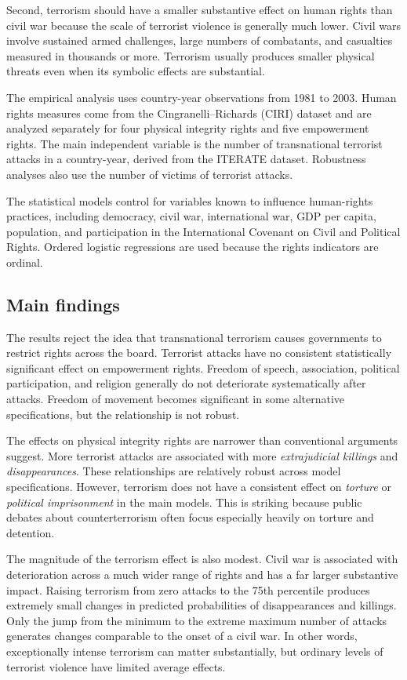 Second, terrorism should have a smaller substantive effect on human rights than civil war because the scale of terrorist violence is generally much lower. Civil wars involve sustained armed challenges, large numbers of combatants, and casualties measured in thousands or more. Terrorism usually produces smaller physical threats even when its symbolic effects are substantial.

The empirical analysis uses country-year observations from 1981 to 2003. Human rights measures come from the Cingranelli--Richards (CIRI) dataset and are analyzed separately for four physical integrity rights and five empowerment rights. The main independent variable is the number of transnational terrorist attacks in a country-year, derived from the ITERATE dataset. Robustness analyses also use the number of victims of terrorist attacks.

The statistical models control for variables known to influence human-rights practices, including democracy, civil war, international war, GDP per capita, population, and participation in the International Covenant on Civil and Political Rights. Ordered logistic regressions are used because the rights indicators are ordinal.

\subsection{Main findings}

The results reject the idea that transnational terrorism causes governments to restrict rights across the board. Terrorist attacks have no consistent statistically significant effect on empowerment rights. Freedom of speech, association, political participation, and religion generally do not deteriorate systematically after attacks. Freedom of movement becomes significant in some alternative specifications, but the relationship is not robust.

The effects on physical integrity rights are narrower than conventional arguments suggest. More terrorist attacks are associated with more \textit{extrajudicial killings} and \textit{disappearances}. These relationships are relatively robust across model specifications. However, terrorism does not have a consistent effect on \textit{torture} or \textit{political imprisonment} in the main models. This is striking because public debates about counterterrorism often focus especially heavily on torture and detention.

The magnitude of the terrorism effect is also modest. Civil war is associated with deterioration across a much wider range of rights and has a far larger substantive impact. Raising terrorism from zero attacks to the 75th percentile produces extremely small changes in predicted probabilities of disappearances and killings. Only the jump from the minimum to the extreme maximum number of attacks generates changes comparable to the onset of a civil war. In other words, exceptionally intense terrorism can matter substantially, but ordinary levels of terrorist violence have limited average effects.

